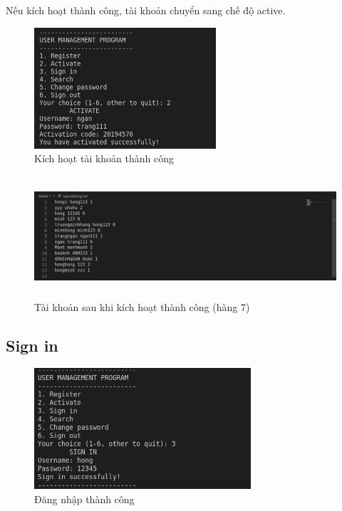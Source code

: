 \documentclass[12pt]{article}
\begin{document}
Nếu kích hoạt thành công, tài khoản chuyển sang chế độ active.
\begin{figure}[!htb]
    \begin{center}
        \includegraphics[width=0.8\linewidth, height=4.5cm]{Img/2_thanhcong.png}
    \end{center}
    \caption{Kích hoạt tài khoản thành công}
    \label{fig:2_thanhcong}
\end{figure}
\begin{figure}[!htb]
    \begin{center}
        \includegraphics[width=0.8\linewidth, height=4.5cm]{Img/Truockhikhoa.png}
    \end{center}
    \caption{Tài khoản sau khi kích hoạt thành công (hàng 7)}
    \label{fig:2_filethanhcong}
\end{figure}

\subsection{Sign in}
\begin{figure}[h]
    \begin{center}
        \includegraphics[width=0.8\linewidth, height=4.5cm]{Img/3_thanhcong.png}
    \end{center}
    \caption{Đăng nhập thành công}
    \label{fig:3_filethanhcong}
\end{figure}
\end{document}
